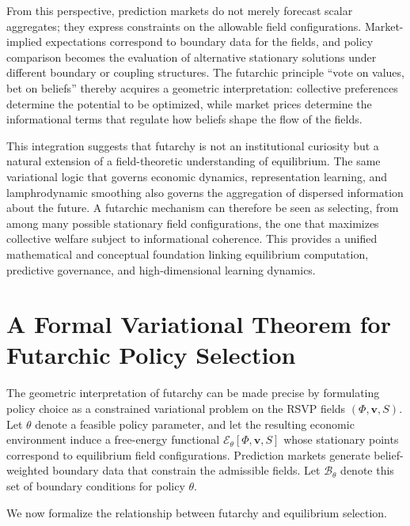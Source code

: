 \documentclass[12pt]{article}
\begin{document}
From this perspective, prediction markets do not merely forecast scalar
aggregates; they express constraints on the allowable field configurations.
Market-implied expectations correspond to boundary data for the fields, and
policy comparison becomes the evaluation of alternative stationary solutions
under different boundary or coupling structures.  The futarchic principle
``vote on values, bet on beliefs'' thereby acquires a geometric interpretation:
collective preferences determine the potential to be optimized, while market
prices determine the informational terms that regulate how beliefs shape the
flow of the fields.

This integration suggests that futarchy is not an institutional curiosity but a
natural extension of a field-theoretic understanding of equilibrium.  The same
variational logic that governs economic dynamics, representation learning, and
lamphrodynamic smoothing also governs the aggregation of dispersed information
about the future.  A futarchic mechanism can therefore be seen as selecting,
from among many possible stationary field configurations, the one that
maximizes collective welfare subject to informational coherence.  This provides
a unified mathematical and conceptual foundation linking equilibrium
computation, predictive governance, and high-dimensional learning dynamics.

\section{A Formal Variational Theorem for Futarchic Policy Selection}

The geometric interpretation of futarchy can be made precise by formulating
policy choice as a constrained variational problem on the RSVP fields
\((\Phi,\mathbf{v},S)\).  Let \(\theta\) denote a feasible policy parameter, and
let the resulting economic environment induce a free-energy functional
\(\mathcal{E}_\theta[\Phi,\mathbf{v},S]\) whose stationary points correspond to
equilibrium field configurations.  Prediction markets generate
belief-weighted boundary data that constrain the admissible fields.  Let
\(\mathcal{B}_\theta\) denote this set of boundary conditions for policy
\(\theta\).

We now formalize the relationship between futarchy and equilibrium selection.
\end{document}
